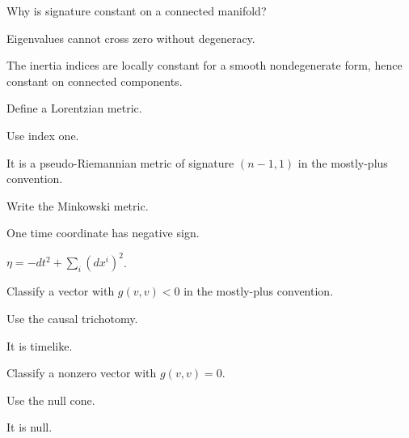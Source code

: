 \begin{exercise}\label{exr:vii29-06}
Why is signature constant on a connected manifold?
\end{exercise}
\begin{hint}
Eigenvalues cannot cross zero without degeneracy.
\end{hint}
\begin{solution}
The inertia indices are locally constant for a smooth nondegenerate form, hence constant on connected components.
\end{solution}

\begin{exercise}\label{exr:vii29-07}
Define a Lorentzian metric.
\end{exercise}
\begin{hint}
Use index one.
\end{hint}
\begin{solution}
It is a pseudo-Riemannian metric of signature \((n-1,1)\) in the mostly-plus convention.
\end{solution}

\begin{exercise}\label{exr:vii29-08}
Write the Minkowski metric.
\end{exercise}
\begin{hint}
One time coordinate has negative sign.
\end{hint}
\begin{solution}
\(\eta=-dt^2+\sum_i(dx^i)^2\).
\end{solution}

\begin{exercise}\label{exr:vii29-09}
Classify a vector with \(g(v,v)<0\) in the mostly-plus convention.
\end{exercise}
\begin{hint}
Use the causal trichotomy.
\end{hint}
\begin{solution}
It is timelike.
\end{solution}

\begin{exercise}\label{exr:vii29-10}
Classify a nonzero vector with \(g(v,v)=0\).
\end{exercise}
\begin{hint}
Use the null cone.
\end{hint}
\begin{solution}
It is null.
\end{solution}

